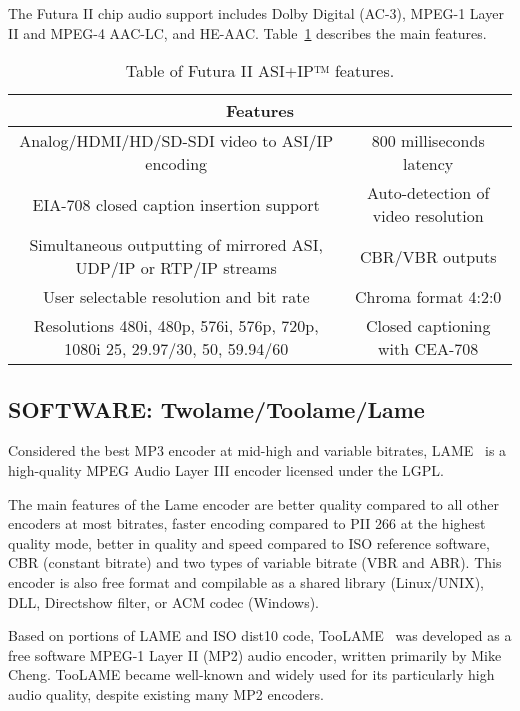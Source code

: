 The Futura II chip audio support includes Dolby Digital (AC-3), MPEG-1 Layer II and MPEG-4 AAC-LC, and HE-AAC.
Table~\ref{tab:futura} describes the main features.

\begin{table}[h]
    \centering
    \begin{tabular}{|c|c|}
        \hline
        \multicolumn{2}{|c|}{\textbf{Features}} \\
        \hline
         Analog/HDMI/HD/SD-SDI video to ASI/IP encoding & 800 milliseconds latency \\
         \hline
          EIA-708 closed caption insertion support & Auto-detection of video resolution \\
         \hline
         Simultaneous outputting of mirrored ASI, UDP/IP or RTP/IP streams & CBR/VBR outputs \\
         \hline
         User selectable resolution and bit rate & Chroma format 4:2:0 \\
         \hline
         Resolutions 480i, 480p, 576i, 576p, 720p, 1080i 25, 29.97/30, 50, 59.94/60 & Closed captioning with CEA-708 \\
         \hline
    \end{tabular}
    \caption{Table of Futura II ASI+IP™ features.}
    \label{tab:futura}
\end{table}

\subsection{SOFTWARE: Twolame/Toolame/Lame}

Considered the best MP3 encoder at mid-high and variable bitrates, LAME~\cite{lame} is a high-quality MPEG Audio Layer III encoder licensed under the LGPL.

The main features of the Lame encoder are better quality compared to all other encoders at most bitrates, faster encoding compared to PII 266 at the highest quality mode, better in quality and speed compared to ISO reference software, CBR (constant bitrate) and two types of variable bitrate (VBR and ABR). This encoder is also free format and compilable as a shared library (Linux/UNIX), DLL, Directshow filter, or ACM codec (Windows).

Based on portions of LAME and ISO dist10 code, TooLAME~\cite{toolame} was developed as a free software MPEG-1 Layer II (MP2) audio encoder, written primarily by Mike Cheng.
TooLAME became well-known and widely used for its particularly high audio quality, despite existing many MP2 encoders.

